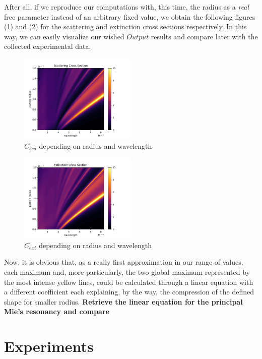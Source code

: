 \documentclass{article}
\numberwithin{equation}{section}
\begin{document}
After all, if we reproduce our computations with, this time, the radius as a \textit{real} free parameter instead of an arbitrary fixed value, we obtain the following figures (\ref{fig:surface_sca}) and (\ref{fig:surface_ext}) for the scattering and extinction cross sections respectively. In this way, we can easily visualize our wished $Output$ results and compare later with the collected experimental data.
\begin{figure}[h]
    \centering
    \includegraphics[width=0.5\textwidth, height=0.4\textwidth]{surface_sca.png}
    \caption{$C_{sca}$ depending on radius and wavelength}
    \label{fig:surface_sca}
\end{figure}
\begin{figure}[h]
    \centering
    \includegraphics[width=0.5\textwidth, height=0.4\textwidth]{surface_ext.png}
    \caption{$C_{ext}$ depending on radius and wavelength}
    \label{fig:surface_ext}
\end{figure}
Now, it is obvious that, as a really first approximation in our range of values, each maximum and, more particularly, the two global maximum represented by the most intense yellow lines, could be calculated through a linear equation with a different coefficient each explaining, by the way, the compression of the defined shape for smaller radius. \textbf{Retrieve the linear equation for the principal Mie's resonancy and compare}

\section{Experiments}
\end{document}
